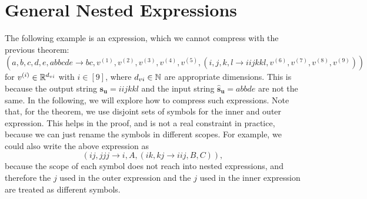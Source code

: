 \section{General Nested Expressions}

The following example is an expression, which we cannot compress with the previous theorem:
$$(a,b,c,d,e,abbcde \rightarrow bc, v^{(1)}, v^{(2)}, v^{(3)}, v^{(4)}, v^{(5)}, (
    i,j,k,l \rightarrow iijkkl, v^{(6)}, v^{(7)}, v^{(8)}, v^{(9)}
    ))$$
for $v^{(i)} \in \mathbb{R}^{d_{vi}}$ with $i \in [9]$, where $d_{vi} \in \mathbb{N}$ are appropriate dimensions.
This is because the output string $\bm{s_u} = iijkkl$ and the input string $\bm{\hat{s}_u} = abbde$ are not the same.
In the following, we will explore how to compress such expressions.
Note that, for the theorem, we use disjoint sets of symbols for the inner and outer expression.
This helps in the proof, and is not a real constraint in practice,
because we can just rename the symbols in different scopes.
For example, we could also write the above expression as
$$(ij, jjj \rightarrow i, A, (ik, kj \rightarrow iij, B, C)),$$
because the scope of each symbol does not reach into nested expressions,
and therefore the $j$ used in the outer expression and the $j$ used in the inner expression are treated as different symbols.


